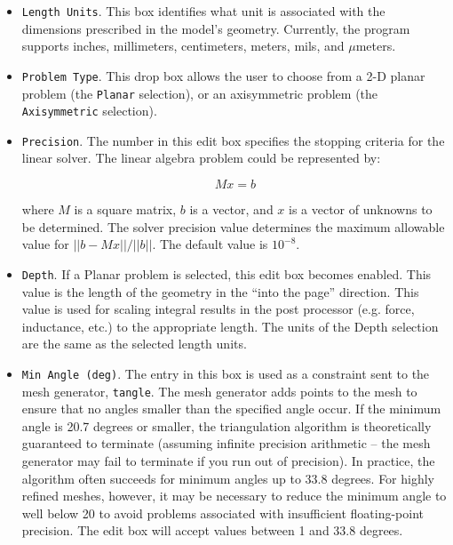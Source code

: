 \begin{itemize}

\item{\tt Length Units}. This box identifies
what unit is associated with the dimensions prescribed in the
model's geometry. Currently, the program supports inches,
millimeters, centimeters, meters, mils, and $\mu $meters.

\item{\tt Problem Type}. This
drop box allows the user to choose from a 2-D planar problem (the
\texttt{Planar} selection), or an axisymmetric problem (the
\texttt{Axisymmetric} selection).

\item{\tt Precision}. The
number in this edit box specifies the stopping criteria for the
linear solver. The linear algebra problem could be represented by:

\begin{displaymath}
M x = b
\end{displaymath}

\noindent
where $M$ is a square matrix, $b$ is a vector, and $x$ is a vector of
unknowns to be determined. The solver precision value determines the maximum
allowable value for $\vert \vert b - Mx\vert \vert / \vert \vert b\vert
\vert $. The default value is $10^{ - 8}$.

\item{\tt Depth}. If a Planar
problem is selected, this edit box becomes enabled. This value is
the length of the geometry in the ``into the page'' direction. This
value is used for scaling integral results in the post processor
(e.g. force, inductance, etc.) to the appropriate length. The units
of the Depth selection are the same as the selected length units.

\item{\tt Min Angle (deg)}.  The entry in this box is used as a
constraint sent to the mesh generator, {\tt tangle}.  The mesh generator
adds points to the mesh to
ensure that no angles smaller than the specified angle occur. If the minimum angle
is 20.7 degrees or smaller, the triangulation algorithm is theoretically guaranteed to
terminate (assuming infinite precision arithmetic -- the mesh generator may
fail to terminate if you run out of precision).  In practice, the
algorithm often succeeds for minimum angles up to 33.8 degrees.
For highly refined meshes, however, it may be necessary to reduce
the minimum angle to well below 20 to avoid problems associated
with insufficient floating-point precision.  The edit box will accept
values between 1 and 33.8 degrees.


\end{itemize}
